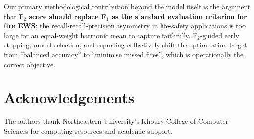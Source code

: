 \documentclass[conference]{IEEEtran}
\begin{document}
Our primary methodological contribution beyond the model itself is the
argument that \textbf{F$_2$ score should replace F$_1$ as the standard
evaluation criterion for fire EWS}: the recall-recall-precision asymmetry
in life-safety applications is too large for an equal-weight harmonic mean
to capture faithfully. F$_2$-guided early stopping, model selection, and
reporting collectively shift the optimisation target from
``balanced accuracy'' to ``minimise missed fires'', which is operationally
the correct objective.

\section*{Acknowledgements}
The authors thank Northeastern University's Khoury College of Computer
Sciences for computing resources and academic support.
\end{document}
